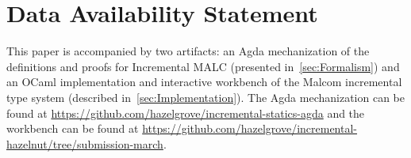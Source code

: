 \section*{Data Availability Statement}

This paper is accompanied by two artifacts: an Agda mechanization of the definitions and proofs for Incremental MALC (presented in~\autoref{sec:Formalism}) and an OCaml implementation and interactive workbench of the Malcom incremental type system (described in~\autoref{sec:Implementation}). The Agda mechanization can be found at \url{https://github.com/hazelgrove/incremental-statics-agda} and the workbench can be found at \url{https://github.com/hazelgrove/incremental-hazelnut/tree/submission-march}.
